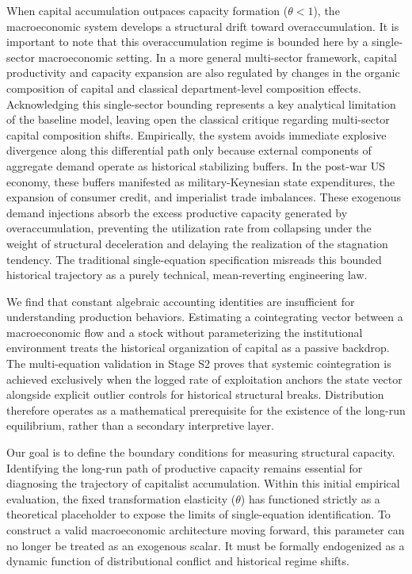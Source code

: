 \documentclass[11pt]{article}
\begin{document}
When capital accumulation outpaces capacity formation ($\theta < 1$), the macroeconomic system develops a structural drift toward overaccumulation. It is important to note that this overaccumulation regime is bounded here by a single-sector macroeconomic setting. In a more general multi-sector framework, capital productivity and capacity expansion are also regulated by changes in the organic composition of capital and classical department-level composition effects. Acknowledging this single-sector bounding represents a key analytical limitation of the baseline model, leaving open the classical critique regarding multi-sector capital composition shifts. Empirically, the system avoids immediate explosive divergence along this differential path only because external components of aggregate demand operate as historical stabilizing buffers. In the post-war US economy, these buffers manifested as military-Keynesian state expenditures, the expansion of consumer credit, and imperialist trade imbalances. These exogenous demand injections absorb the excess productive capacity generated by overaccumulation, preventing the utilization rate from collapsing under the weight of structural deceleration and delaying the realization of the stagnation tendency. The traditional single-equation specification misreads this bounded historical trajectory as a purely technical, mean-reverting engineering law.

We find that constant algebraic accounting identities are insufficient for understanding production behaviors. Estimating a cointegrating vector between a macroeconomic flow and a stock without parameterizing the institutional environment treats the historical organization of capital as a passive backdrop. The multi-equation validation in Stage S2 proves that systemic cointegration is achieved exclusively when the logged rate of exploitation anchors the state vector alongside explicit outlier controls for historical structural breaks. Distribution therefore operates as a mathematical prerequisite for the existence of the long-run equilibrium, rather than a secondary interpretive layer.

Our goal is to define the boundary conditions for measuring structural capacity. Identifying the long-run path of productive capacity remains essential for diagnosing the trajectory of capitalist accumulation. Within this initial empirical evaluation, the fixed transformation elasticity ($\theta$) has functioned strictly as a theoretical placeholder to expose the limits of single-equation identification. To construct a valid macroeconomic architecture moving forward, this parameter can no longer be treated as an exogenous scalar. It must be formally endogenized as a dynamic function of distributional conflict and historical regime shifts.

\pagebreak


\pagebreak
\appendix

\pagebreak

\end{document}
